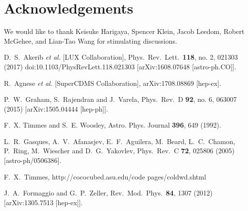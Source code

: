 \documentclass[twocolumn,preprintnumbers,amsmath,amssymb,prd, superscriptaddress]{revtex4} %
\begin{document}
\section*{Acknowledgements}
We would like to thank Keisuke Harigaya, Spencer Klein, Jacob Leedom, Robert McGehee, and Lian-Tao Wang for stimulating discussions.

\begin{thebibliography}{99}


  D.~S.~Akerib {\it et al.} [LUX Collaboration],
  Phys.\ Rev.\ Lett.\  {\bf 118}, no. 2, 021303 (2017)
  doi:10.1103/PhysRevLett.118.021303
  [arXiv:1608.07648 [astro-ph.CO]].

  R.~Agnese {\it et al.} [SuperCDMS Collaboration],
  arXiv:1708.08869 [hep-ex].

  P.~W.~Graham, S.~Rajendran and J.~Varela,
  Phys.\ Rev.\ D {\bf 92}, no. 6, 063007 (2015)
  [arXiv:1505.04444 [hep-ph]].


 F.~X. Timmes and S.~E. Woosley, Astro. Phys. Journal {\bf 396}, 649 (1992).

  L.~R.~Gasques, A.~V.~Afanasjev, E.~F.~Aguilera, M.~Beard, L.~C.~Chamon, P.~Ring, M.~Wiescher and D.~G.~Yakovlev,
  Phys.\ Rev.\ C {\bf 72}, 025806 (2005)
  [astro-ph/0506386].


F.~X.~Timmes, http://cococubed.asu.edu/code pages/coldwd.shtml

  J.~A.~Formaggio and G.~P.~Zeller,
  Rev.\ Mod.\ Phys.\  {\bf 84}, 1307 (2012)
  [arXiv:1305.7513 [hep-ex]].



\end{thebibliography}
\end{document}
